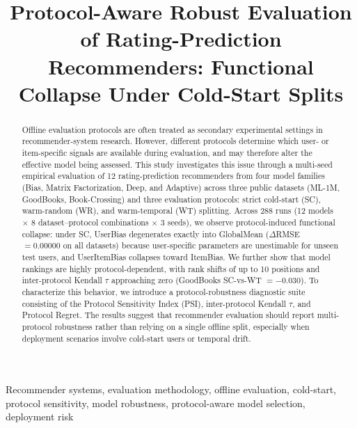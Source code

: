 \documentclass[journal]{IEEEtran}
\begin{document}
\title{Protocol-Aware Robust Evaluation of Rating-Prediction Recommenders: Functional Collapse Under Cold-Start Splits}

\author{
}

\maketitle

\begin{abstract}
Offline evaluation protocols are often treated as secondary experimental settings in recommender-system research. However, different protocols determine which user- or item-specific signals are available during evaluation, and may therefore alter the effective model being assessed. This study investigates this issue through a multi-seed empirical evaluation of 12 rating-prediction recommenders from four model families (Bias, Matrix Factorization, Deep, and Adaptive) across three public datasets (ML-1M, GoodBooks, Book-Crossing) and three evaluation protocols: strict cold-start (SC), warm-random (WR), and warm-temporal (WT) splitting. Across 288 runs (12 models $\times$ 8 dataset--protocol combinations $\times$ 3 seeds), we observe protocol-induced functional collapse: under SC, UserBias degenerates exactly into GlobalMean ($\Delta$RMSE~$=0.00000$ on all datasets) because user-specific parameters are unestimable for unseen test users, and UserItemBias collapses toward ItemBias. We further show that model rankings are highly protocol-dependent, with rank shifts of up to 10 positions and inter-protocol Kendall $\tau$ approaching zero (GoodBooks SC-vs-WT $= -0.030$). To characterize this behavior, we introduce a protocol-robustness diagnostic suite consisting of the Protocol Sensitivity Index (PSI), inter-protocol Kendall $\tau$, and Protocol Regret. The results suggest that recommender evaluation should report multi-protocol robustness rather than relying on a single offline split, especially when deployment scenarios involve cold-start users or temporal drift.
\end{abstract}

\begin{IEEEkeywords}
Recommender systems, evaluation methodology, offline evaluation, cold-start, protocol sensitivity, model robustness, protocol-aware model selection, deployment risk
\end{IEEEkeywords}

\end{document}
